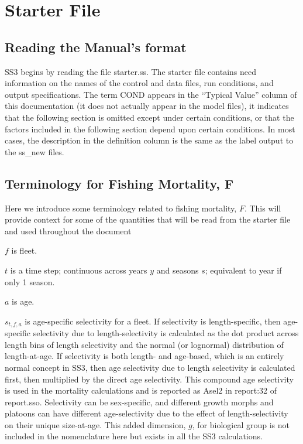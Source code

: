 
\section{Starter File}

\subsection{Reading the Manual's format}
SS3 begins by reading the file starter.ss. The starter file contains need information on the names of the control and data files, run conditions, and output specifications. The term COND appears in the ``Typical Value'' column of this documentation (it does not actually appear in the model files), it indicates that the following section is omitted except under certain conditions, or that the factors included in the following section depend upon certain conditions. In most cases, the description in the definition column is the same as the label output to the ss\_new files.

\subsection{Terminology for Fishing Mortality, F}
Here we introduce some terminology related to fishing mortality, $F$. This will provide context for some of the quantities that will be read from the starter file and used throughout the document

$f$ is fleet.

$t$ is a time step; continuous across years $y$ and seasons $s$; equivalent to year if only 1 season.

$a$ is age.

$s_{t,f,a}$ is age-specific selectivity for a fleet. If selectivity is length-specific, then age-specific selectivity due to length-selectivity is calculated as the dot product across length bins of length selectivity and the normal (or lognormal) distribution of length-at-age. If selectivity is both length- and age-based, which is an entirely normal concept in SS3, then age selectivity due to length selectivity is calculated first, then multiplied by the direct age selectivity. This compound age selectivity is used in the mortality calculations and is reported as Asel2 in report:32 of report.sso. Selectivity can be sex-specific, and different growth morphs and platoons can have different age-selectivity due to the effect of length-selectivity on their unique size-at-age. This added dimension, $g$, for biological group is not included in the nomenclature here but exists in all the SS3 calculations.

